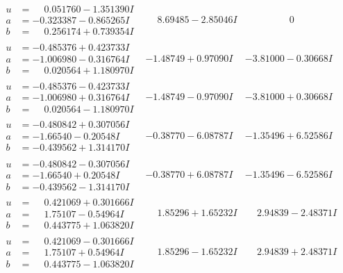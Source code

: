 \documentclass[1p]{elsarticle_modified}
\theoremstyle{definition}
\begin{document}
$$\begin{array}{c|c|c}
\begin{aligned}
u &= \phantom{-}0.051760 - 1.351390 I \\
a &= -0.323387 - 0.865265 I \\
b &= \phantom{-}0.256174 + 0.739354 I\end{aligned}
 & \phantom{-}8.69485 - 2.85046 I & \phantom{-0.000000 } 0 \\ \hline\begin{aligned}
u &= -0.485376 + 0.423733 I \\
a &= -1.006980 - 0.316764 I \\
b &= \phantom{-}0.020564 + 1.180970 I\end{aligned}
 & -1.48749 + 0.97090 I & -3.81000 - 0.30668 I \\ \hline\begin{aligned}
u &= -0.485376 - 0.423733 I \\
a &= -1.006980 + 0.316764 I \\
b &= \phantom{-}0.020564 - 1.180970 I\end{aligned}
 & -1.48749 - 0.97090 I & -3.81000 + 0.30668 I \\ \hline\begin{aligned}
u &= -0.480842 + 0.307056 I \\
a &= -1.66540 - 0.20548 I \\
b &= -0.439562 + 1.314170 I\end{aligned}
 & -0.38770 - 6.08787 I & -1.35496 + 6.52586 I \\ \hline\begin{aligned}
u &= -0.480842 - 0.307056 I \\
a &= -1.66540 + 0.20548 I \\
b &= -0.439562 - 1.314170 I\end{aligned}
 & -0.38770 + 6.08787 I & -1.35496 - 6.52586 I \\ \hline\begin{aligned}
u &= \phantom{-}0.421069 + 0.301666 I \\
a &= \phantom{-}1.75107 - 0.54964 I \\
b &= \phantom{-}0.443775 + 1.063820 I\end{aligned}
 & \phantom{-}1.85296 + 1.65232 I & \phantom{-}2.94839 - 2.48371 I \\ \hline\begin{aligned}
u &= \phantom{-}0.421069 - 0.301666 I \\
a &= \phantom{-}1.75107 + 0.54964 I \\
b &= \phantom{-}0.443775 - 1.063820 I\end{aligned}
 & \phantom{-}1.85296 - 1.65232 I & \phantom{-}2.94839 + 2.48371 I\\

\end{array}$$
\end{document}
